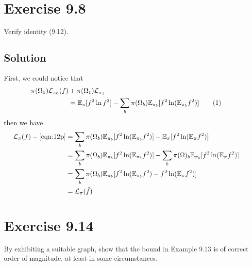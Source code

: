 \documentclass{article}
\newcommand\numberthis{\addtocounter{equation}{1}\tag{\theequation}}
\begin{document}
\section{Exercise 9.8}
Verify identity (9.12).
\subsection{Solution}
First, we could notice that
\begin{align*}
  \pi(\Omega_0)\mathcal{L}_{\pi_0}(f) &+ \pi(\Omega_1)\mathcal{L}_{\pi_1} \\
  &= \mathbb{E}_\pi [f^2\ln f^2] - \sum_{b} \pi(\Omega_b)\mathbb{E}_{\pi_b}[f^2\ln (\mathbb{E}_{\pi_b}f^2)] \numberthis \label{eqn:12p}
\end{align*}
then we have
\begin{align*}
  \mathcal{L}_\pi(f) - \eqref{eqn:12p} &=  \sum_{b} \pi(\Omega_b)\mathbb{E}_{\pi_b}[f^2\ln (\mathbb{E}_{\pi_b}f^2)] - \mathbb{E}_\pi [f^2\ln(\mathbb{E}_\pi f^2)]  \\
                                       &= \sum_{b} \pi(\Omega_b)\mathbb{E}_{\pi_b}[f^2\ln (\mathbb{E}_{\pi_b}f^2)] - \sum_b \pi(\Omega)_b \mathbb{E}_{\pi_b} [f^2\ln(\mathbb{E}_\pi f^2)]  \\
                                       &= \sum_b \pi(\Omega_b) \mathbb{E}_{\pi_b} [f^2\ln(\mathbb{E}_{\pi_b}f^2) - f^2\ln(\mathbb{E}_{\pi}f^2)] \\
  &= \mathcal{L}_\pi(\bar{f})
\end{align*}

\section{Exercise 9.14}
By exhibiting a suitable graph, show that the bound in Example 9.13 is of correct order of magnitude, at least in some circumstances.
\end{document}
